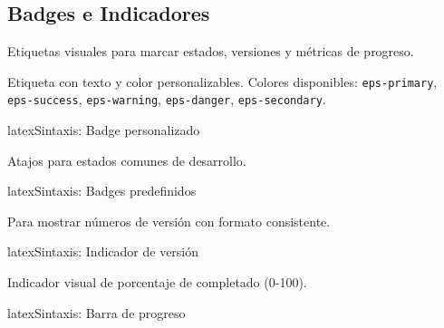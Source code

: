 \subsection{Badges e Indicadores}
\label{subsec:badges}

Etiquetas visuales para marcar estados, versiones y métricas de progreso.

Etiqueta con texto y color personalizables. Colores disponibles: \texttt{eps-primary},
\texttt{eps-success}, \texttt{eps-warning}, \texttt{eps-danger}, \texttt{eps-secondary}.

\begin{codigosimple}{latex}{Sintaxis: Badge personalizado}
\end{codigosimple}

\noindent
{} \quad
{} \quad
{} \quad
{} \quad
{}

Atajos para estados comunes de desarrollo.

\begin{codigosimple}{latex}{Sintaxis: Badges predefinidos}
\badgenew \badgewip \badgedeprecated
\badgebeta \badgerequired \badgeoptional
\end{codigosimple}

\noindent
\badgenew \quad \badgewip \quad \badgedeprecated \quad
\badgebeta \quad \badgerequired \quad \badgeoptional

Para mostrar números de versión con formato consistente.

\begin{codigosimple}{latex}{Sintaxis: Indicador de versión}
 
\end{codigosimple}

\noindent
{} \quad {} \quad {}

Indicador visual de porcentaje de completado (0-100).

\begin{codigosimple}{latex}{Sintaxis: Barra de progreso}
 
\end{codigosimple}

